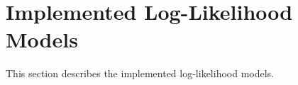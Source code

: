 \documentclass{article}
\newcommand{\code}[1]{\texttt{#1}}
\newcommand{\class}[1]{\colorbox{blue!30}{\code{#1}}}
\begin{document}
\section{Implemented Log-Likelihood Models}
This section describes the implemented log-likelihood models. \cite{TimeDepPSSearchMethods2010}

%
%



\end{document}
